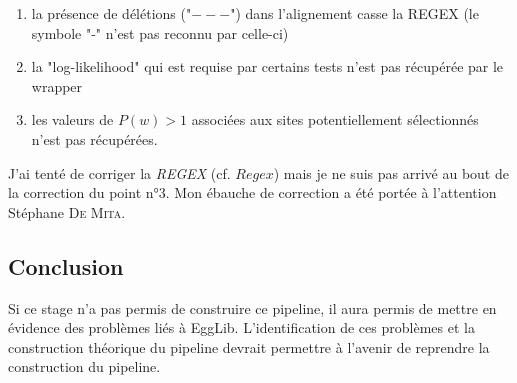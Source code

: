 \documentclass[../main]{subfiles} %
\begin{document}
\begin{enumerate}
    \item la présence de délétions ("$---$") dans l'alignement casse la \acrshort{REGEX} (le symbole "-" n'est pas reconnu par celle-ci)
    \item la "log-likelihood" qui est requise par certains tests n'est pas récupérée par le \gls{wrapper}
    \item les valeurs de $P(w)>1$ associées aux sites potentiellement sélectionnés n'est pas récupérées.
\end{enumerate}

J'ai tenté de corriger la \textit{REGEX} (cf. \cite{florent_f-marchalm1bioinfointernship2024-inrae_agap_ge2pop_2024} $Regex$) mais je ne suis pas arrivé au bout de la correction du point n°3. Mon ébauche de correction a été portée à l'attention Stéphane \textsc{De Mita}. 

\subsection{Conclusion}
\label{sec:EggConclusion}
Si ce stage n'a pas permis de construire ce pipeline, il aura permis de mettre en évidence des problèmes liés à \gls{EggLib}. L'identification de ces problèmes et la construction théorique du pipeline devrait permettre à l'avenir de reprendre la construction du pipeline.

\end{document}
